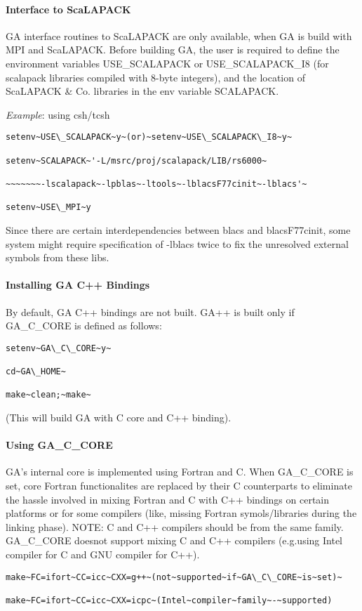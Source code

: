 \paragraph{Interface to ScaLAPACK}

GA interface routines to ScaLAPACK are only available, when GA is
build with MPI and ScaLAPACK. Before building GA, the user is required
to define the environment variables USE\_SCALAPACK or USE\_SCALAPACK\_I8
(for scalapack libraries compiled with 8-byte integers), and the location
of ScaLAPACK \& Co. libraries in the env variable SCALAPACK.

\emph{Example}: using csh/tcsh
\begin{verbatim}
setenv~USE\_SCALAPACK~y~(or)~setenv~USE\_SCALAPACK\_I8~y~

setenv~SCALAPACK~'-L/msrc/proj/scalapack/LIB/rs6000~

~~~~~~~-lscalapack~-lpblas~-ltools~-lblacsF77cinit~-lblacs'~

setenv~USE\_MPI~y
\end{verbatim}
Since there are certain interdependencies between blacs and blacsF77cinit,
some system might require specification of -lblacs twice to fix the
unresolved external symbols from these libs.


\paragraph{Installing GA C++ Bindings}

By default, GA C++ bindings are not built. GA++ is built only if GA\_C\_CORE
is defined as follows: 
\begin{verbatim}
setenv~GA\_C\_CORE~y~

cd~GA\_HOME~

make~clean;~make~
\end{verbatim}
(This will build GA with C core and C++ binding).


\paragraph{Using GA\_C\_CORE}

GA's internal core is implemented using Fortran and C. When GA\_C\_CORE
is set, core Fortran functionalites are replaced by their C counterparts
to eliminate the hassle involved in mixing Fortran and C with C++
bindings on certain platforms or for some compilers (like, missing
Fortran symols/libraries during the linking phase). NOTE: C and C++
compilers should be from the same family. GA\_C\_CORE doesnot support
mixing C and C++ compilers (e.g.using Intel compiler for C and GNU
compiler for C++). 
\begin{verbatim}
make~FC=ifort~CC=icc~CXX=g++~(not~supported~if~GA\_C\_CORE~is~set)~

make~FC=ifort~CC=icc~CXX=icpc~(Intel~compiler~family~-~supported)
\end{verbatim}

